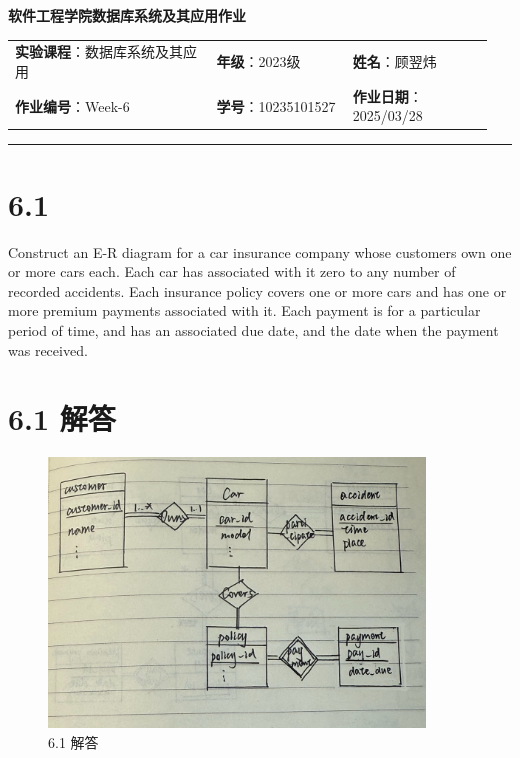 \documentclass{article}
\begin{document}
	
	\begin{center}
		{\Large{\textbf{\heiti 软件工程学院数据库系统及其应用作业}}}
		\begin{table}[htb]
			\flushleft
			\begin{tabular}{p{0.4\linewidth}p{0.27\linewidth}p{0.28\linewidth}}\\
				\textbf{实验课程}：数据库系统及其应用  & \textbf{年级}：2023级       & \textbf{姓名}：顾翌炜  \\
				\textbf{作业编号}：Week-6    & \textbf{学号}：10235101527 & \textbf{作业日期}：2025/03/28  \\
			\end{tabular}
		\end{table}
	\end{center}
	\rule{\textwidth}{2pt}
	
	\setlength{\parindent}{2em}
	
	\section*{6.1}
	
	Construct an E-R diagram for a car insurance company whose customers own one or more cars each. Each car has associated with it zero to any number of recorded accidents. Each insurance policy covers one or more cars and has one or more premium payments associated with it. Each payment is for a particular period of time, and has an associated due date, and the date when the payment was received.
	
	\section*{6.1 解答}
	
	\begin{figure}[H]
		\centering
		\includegraphics[width=10cm]{./images/6.1.jpg}
		\caption{6.1 解答}
	\end{figure}
	
\end{document}
